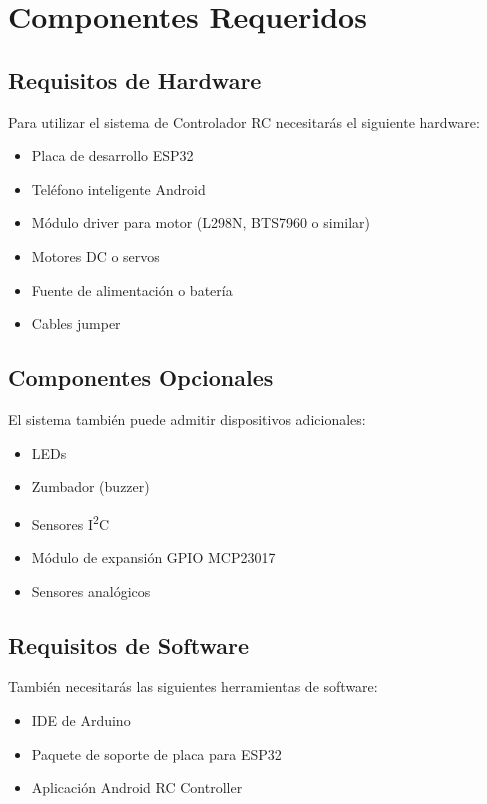 \chapter{Componentes Requeridos}

\section{Requisitos de Hardware}

Para utilizar el sistema de Controlador RC necesitarás el siguiente hardware:

\begin{itemize}
    \item Placa de desarrollo ESP32
    \item Teléfono inteligente Android
    \item Módulo driver para motor (L298N, BTS7960 o similar)
    \item Motores DC o servos
    \item Fuente de alimentación o batería
    \item Cables jumper
\end{itemize}

\section{Componentes Opcionales}

El sistema también puede admitir dispositivos adicionales:

\begin{itemize}
    \item LEDs
    \item Zumbador (buzzer)
    \item Sensores I\textsuperscript{2}C
    \item Módulo de expansión GPIO MCP23017
    \item Sensores analógicos
\end{itemize}

\section{Requisitos de Software}

También necesitarás las siguientes herramientas de software:

\begin{itemize}
    \item IDE de Arduino
    \item Paquete de soporte de placa para ESP32
    \item Aplicación Android RC Controller
\end{itemize}